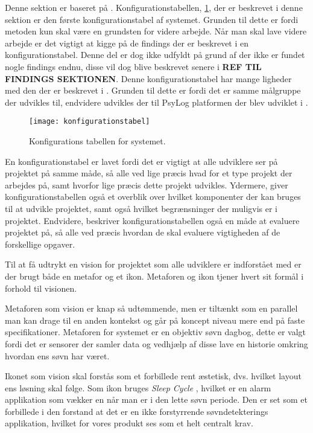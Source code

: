Denne sektion er baseret på \citet{art:essence}.
Konfigurationstabellen, \cref{tab:konfigurationsTabel}, der er beskrevet i denne sektion er den første konfigurationstabel af systemet.
Grunden til dette er fordi metoden kun skal være en grundsten for videre arbejde.
Når man skal lave videre arbejde er det vigtigt at kigge på de findings der er beskrevet i en konfigurationstabel.
Denne del er dog ikke udfyldt på grund af der ikke er fundet nogle findings endnu, disse vil dog blive beskrevet senere i \textbf{REF TIL FINDINGS SEKTIONEN}. 
Denne konfigurationstabel har mange ligheder med den der er beskrevet i \citet{misc:faellesrapp}.
Grunden til dette er fordi det er samme målgruppe der udvikles til, endvidere udvikles der til PsyLog platformen der blev udviklet i \citet{misc:faellesrapp}.

\begin{figure}[]\centering
	\texttt{[image: konfigurationstabel]}
	\caption{Konfigurations tabellen for systemet.}
	\label{tab:konfigurationsTabel}
\end{figure}

En konfigurationstabel er lavet fordi det er vigtigt at alle udviklere ser på projektet på samme måde, så alle ved lige præcis hvad for et type projekt der arbejdes på, samt hvorfor lige præcis dette projekt udvikles.
Ydermere, giver konfigurationstabellen også et overblik over hvilket komponenter der kan bruges til at udvikle projektet, samt også hvilket begrænsninger der muligvis er i projektet.
Endvidere, beskriver konfigurationstabellen også en måde at evaluere projektet på, så alle ved præcis hvordan de skal evaluere vigtigheden af de forskellige opgaver.

Til at få udtrykt en vision for projektet som alle udviklere er indforstået med er der brugt både en metafor og et ikon.
Metaforen og ikon tjener hvert sit formål i forhold til visionen.

Metaforen som vision er knap så udtømmende, men er tiltænkt som en parallel man kan drage til en anden kontekst og går på koncept niveau mere end på faste specifikationer.
Metaforen for systemet er en objektiv søvn dagbog, dette er valgt fordi det er sensorer der samler data og vedhjælp af disse lave en historie omkring hvordan ens søvn har været.

Ikonet som vision skal forstås som et forbillede rent æstetisk, dvs. hvilket layout ens løsning skal følge.
Som ikon bruges \textit{Sleep Cycle} \citep{misc:sleepCycle}, hvilket er en alarm applikation som vækker en når man er i den lette søvn periode.
Den er set som et forbillede i den forstand at det er en ikke forstyrrende søvndetekterings applikation, hvilket for vores produkt ses som et helt centralt krav.


